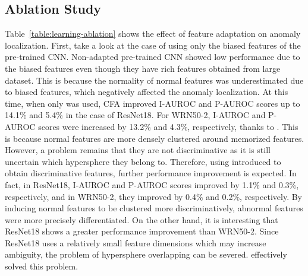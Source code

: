 \documentclass[10pt,twocolumn,letterpaper]{article}
\begin{document}
    \subsection{Ablation Study}
        Table~\ref{table:learning-ablation} shows the effect of feature adaptation on anomaly localization. First, take a look at the case of using only the biased features of the pre-trained CNN. 
        Non-adapted pre-trained CNN showed low performance due to the biased features even though they have rich features obtained from large dataset.
        This is because the normality of normal features was underestimated due to biased features, which negatively affected the anomaly localization. At this time, when only  was used, CFA improved I-AUROC and P-AUROC scores up to 14.1\% and 5.4\% in the case of ResNet18. For WRN50-2, I-AUROC and P-AUROC scores were increased by 13.2\% and 4.3\%, respectively, thanks to . This is because normal features are more densely clustered around memorized features. However, a problem remains that they are not discriminative as it is still uncertain which hypersphere they belong to. Therefore, using  introduced to obtain discriminative features, further performance improvement is expected. In fact, in ResNet18, I-AUROC and P-AUROC scores improved by 1.1\% and 0.3\%, respectively, and in WRN50-2, they improved by 0.4\% and 0.2\%, respectively. By inducing normal features to be clustered more discriminatively, abnormal features were more precisely differentiated. On the other hand, it is interesting that ResNet18 shows a greater performance improvement than WRN50-2. Since ResNet18 uses a relatively small feature dimensions which may increase ambiguity, the problem of hypersphere overlapping can be severed.  effectively solved this problem.
        
\end{document}
